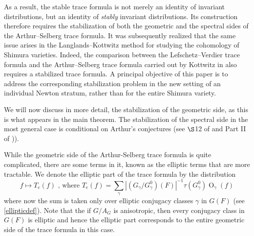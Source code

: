 \documentclass[11pt,a4paper]{article}
\theoremstyle{definition}
\theoremstyle{plain}
\theoremstyle{remark}
\theoremstyle{plain}
\DeclareMathOperator{\Or}{O}
\begin{document}
As a result, the stable trace formula is not merely an identity of invariant distributions, but an identity of \textit{stably} invariant distributions. Its construction therefore requires the stabilization of both the geometric and the spectral sides of the Arthur--Selberg trace formula. It was subsequently realized that the same issue arises in the Langlands--Kottwitz method for studying the cohomology of Shimura varieties. Indeed, the comparison between the Lefschetz--Verdier trace formula and the Arthur--Selberg trace formula carried out by Kottwitz in \cite{MR1044820} also requires a stabilized trace formula. A principal objective of this paper is to address the corresponding stabilization problem in the new setting of an individual Newton stratum, rather than for the entire Shimura variety.


We will now discuss in more detail, the stabilization of the geometric side, as this is what appears in the main theorem. The stabilization of the spectral side in the most general case is conditional on Arthur's conjectures (see $\S$12 of \cite{MR0757954} and Part II of \cite{MR1044820})).

While the geometric side of the Arthur-Selberg trace formula is quite complicated, there are some terms in it, known as the elliptic terms that are more tractable. We denote the elliptic part of the trace formula by the distribution $$ f \mapsto T_e(f) \text{ , where } T_e(f) = \sum_{\gamma} |(G_{\gamma}/G_{\gamma}^0)(F)|^{-1}\tau(G_{\gamma}^0) \Or_{\gamma}(f) $$
where now the sum is taken only over elliptic conjugacy classes $\gamma$ in $G(F)$ (see \ref{ellipticdef}). Note that the if $G/ A_G$ is anisotropic, then every conjugacy class in $G(F)$ is elliptic and hence the elliptic part corresponds to the entire geometric side of the trace formula in this case.
\end{document}
